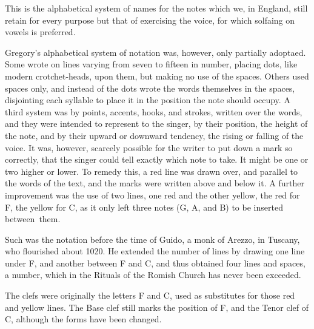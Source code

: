 \bigskip
{}
\bigskip



This is the alphabetical system of names for the notes which we, in England,
still retain for every purpose but that of exercising the voice, for which solfaing
on vowels is preferred.

Gregory’s alphabetical system of notation was, however, only partially adoptaed.
Some wrote on lines varying from seven to fifteen in number, placing dots, like
modern crotchet-heads, upon them, but making no use of the spaces. Others used
spaces only, and instead of the dots wrote the words themselves in the spaces, disjointing
each syllable to place it in the position the note should occupy. A third
system was by points, accents, hooks, and strokes, written over the words, and they
were intended to represent to the singer, by their position, the height of the note,
and by their upward or downward tendency, the rising or falling of the voice. It
was, however, scarcely possible for the writer to put down a mark so correctly,
that the singer could tell exactly which note to take. It might be one or two
higher or lower. To remedy this, a red line was drawn over, and parallel to the
words of the text, and the marks were written above and below it. A further
improvement was the use of two lines, one red and the other yellow, the red for F,
the yellow for C, as it only left three notes (G, A, and B) to be inserted between~them. %

Such was the notation before the time of Guido, a monk of Arezzo, in Tuscany,
who flourished about 1020. He extended the number of lines by drawing one
line under F, and another between F and C, and thus obtained four lines and
spaces, a number, which in the Rituals of the Romish Church has never been
exceeded.

The clefs were originally the letters F and C, used as substitutes for those red
and yellow lines. The Base clef still marks the position of F, and the Tenor
clef of C, although the forms have been changed.



